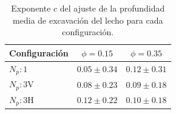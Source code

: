 \begin{table}[H]
    \centering
    \caption{Exponente \(c\) del ajuste de la profundidad media de excavación del lecho para cada configuración.}
    \label{tab:exponentes_dmean}
    \begin{tabular}{lcc}
        \toprule
        \textbf{Configuración} & \(\phi = 0.15\) & \(\phi = 0.35\) \\
        \midrule
        \(N_p:1\) & \(0.05 \pm 0.34\) & \(0.12 \pm 0.31\) \\
        \(N_p:3\text{V}\) & \(0.08 \pm 0.23\) & \(0.09 \pm 0.18\) \\
        \(N_p:3\text{H}\) & \(0.12 \pm 0.22\) & \(0.10 \pm 0.18\) \\
        \bottomrule
    \end{tabular}
\end{table}